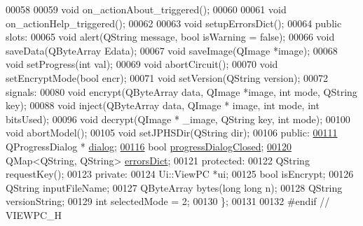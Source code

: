 \begin{DoxyCode}
00058 
00059     \textcolor{keywordtype}{void} on\_actionAbout\_triggered();
00060 
00061     \textcolor{keywordtype}{void} on\_actionHelp\_triggered();
00062 
00063     \textcolor{keywordtype}{void} setupErrorsDict();
00064 \textcolor{keyword}{public} slots:
00065     \textcolor{keywordtype}{void} alert(QString message, \textcolor{keywordtype}{bool} isWarning = \textcolor{keyword}{false});
00066     \textcolor{keywordtype}{void} saveData(QByteArray Edata);
00067     \textcolor{keywordtype}{void} saveImage(QImage *image);
00068     \textcolor{keywordtype}{void} setProgress(\textcolor{keywordtype}{int} val);
00069     \textcolor{keywordtype}{void} abortCircuit();
00070     \textcolor{keywordtype}{void} setEncryptMode(\textcolor{keywordtype}{bool} encr);
00071     \textcolor{keywordtype}{void} setVersion(QString version);
00072 signals:
00080     \textcolor{keywordtype}{void} encrypt(QByteArray data, QImage *image, \textcolor{keywordtype}{int} mode, QString key);
00088     \textcolor{keywordtype}{void} inject(QByteArray data, QImage * image, \textcolor{keywordtype}{int} mode, \textcolor{keywordtype}{int} bitsUsed);
00096     \textcolor{keywordtype}{void} decrypt(QImage * \_image, QString key, \textcolor{keywordtype}{int} mode);
00100     \textcolor{keywordtype}{void} abortModel();
00105     \textcolor{keywordtype}{void} setJPHSDir(QString dir);
00106 \textcolor{keyword}{public}:
\hypertarget{viewpc_8h_source.tex_l00111}{}\hyperlink{class_view_p_c_a31abbb470fe329b44e6ffee202b903ca}{00111}     QProgressDialog * \hyperlink{class_view_p_c_a31abbb470fe329b44e6ffee202b903ca}{dialog};
\hypertarget{viewpc_8h_source.tex_l00116}{}\hyperlink{class_view_p_c_add8c82aa2b0b934212aa5bde9277ab36}{00116}     \textcolor{keywordtype}{bool} \hyperlink{class_view_p_c_add8c82aa2b0b934212aa5bde9277ab36}{progressDialogClosed};
\hypertarget{viewpc_8h_source.tex_l00120}{}\hyperlink{class_view_p_c_aaf7f058e5589d65fec72a21abfd5629b}{00120}     QMap<QString, QString> \hyperlink{class_view_p_c_aaf7f058e5589d65fec72a21abfd5629b}{errorsDict};
00121 \textcolor{keyword}{protected}:
00122     QString requestKey();
00123 \textcolor{keyword}{private}:
00124     Ui::ViewPC *ui;
00125     \textcolor{keywordtype}{bool} isEncrypt;
00126     QString inputFileName;
00127     QByteArray bytes(\textcolor{keywordtype}{long} \textcolor{keywordtype}{long} n);
00128     QString versionString;
00129     \textcolor{keywordtype}{int} selectedMode = 2;
00130 \};
00131 
00132 \textcolor{preprocessor}{#endif // VIEWPC\_H}
\end{DoxyCode}
